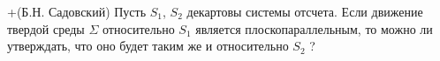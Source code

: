 +(Б.Н. Садовский)
Пусть $S_{1}$, $S_{2}$  декартовы системы отсчета. Если движение твердой среды $\Sigma$
относительно $S_{1}$ является плоскопараллельным, то можно ли утверждать,
что оно будет таким же и относительно $S_{2}$ ?
